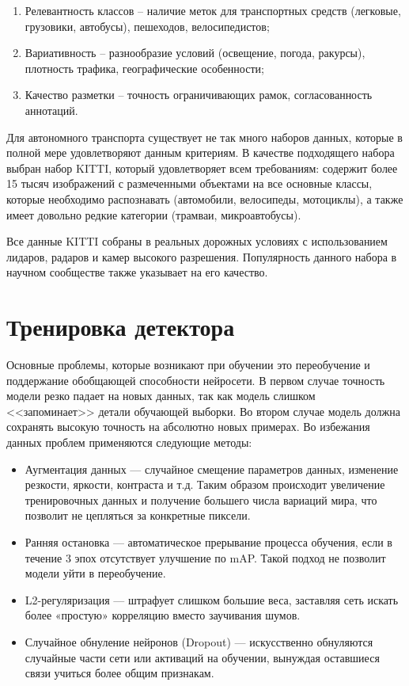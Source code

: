 \begin{enumerate}
    \item Релевантность классов -- наличие меток для транспортных средств (легковые, грузовики, автобусы), пешеходов, велосипедистов;
    \item Вариативность -- разнообразие условий (освещение, погода, ракурсы), плотность трафика, географические особенности;
    \item Качество разметки -- точность ограничивающих рамок, согласованность аннотаций.
\end{enumerate}

Для автономного транспорта существует не так много наборов данных, которые в полной мере удовлетворяют данным критериям. 
В качестве подходящего набора выбран набор KITTI, который удовлетворяет всем требованиям: содержит более 15 тысяч изображений
с размеченными объектами на все основные классы, которые необходимо распознавать (автомобили, велосипеды, мотоциклы), а также
имеет довольно редкие категории (трамваи, микроавтобусы).

Все данные KITTI собраны в реальных дорожных условиях с использованием лидаров, радаров и камер высокого разрешения. Популярность данного
набора в научном сообществе также указывает на его качество.

\section{Тренировка детектора}

Основные проблемы, которые возникают при обучении это переобучение и поддержание обобщающей способности нейросети. В первом случае точность модели резко падает на новых данных, так как модель слишком <<запоминает>> детали обучающей выборки. Во втором случае модель должна сохранять высокую точность на абсолютно новых примерах. Во избежания данных проблем применяются следующие методы:

\begin{itemize}
    \item Аугментация данных --- случайное смещение параметров данных, изменение резкости, яркости, контраста и т.д. Таким образом происходит увеличение тренировочных данных и получение большего числа вариаций мира, что позволит не цепляться за конкретные пиксели.
    \item Ранняя остановка --- автоматическое прерывание процесса обучения, если в течение 3 эпох отсутствует улучшение по mAP. Такой подход не позволит модели уйти в переобучение.
    \item L2-регуляризация --- штрафует слишком большие веса, заставляя сеть искать более «простую» корреляцию вместо заучивания шумов.
    \item Случайное обнуление нейронов (Dropout) --- искусственно обнуляются случайные части сети или активаций на обучении, вынуждая оставшиеся связи учиться более общим признакам.
\end{itemize}


